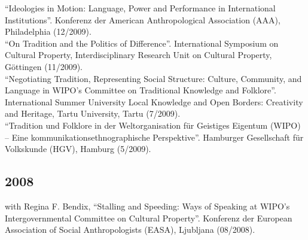 \enquote{Ideologies in Motion: Language, Power and Performance in International Institutions}. Konferenz der American Anthropological Association (AAA), Philadelphia (12/2009).\\[.25cm]\enquote{On Tradition and the Politics of Difference}. International Symposium on Cultural Property, Interdisciplinary Research Unit on Cultural Property, Göttingen (11/2009).\\[.25cm]\enquote{Negotiating Tradition, Representing Social Structure: Culture, Community, and Language in WIPO’s Committee on Traditional Knowledge and Folklore}. International Summer University Local Knowledge and Open Borders: Creativity and Heritage, Tartu University, Tartu (7/2009).\\[.25cm]\enquote{Tradition und Folklore in der Weltorganisation für Geistiges Eigentum (WIPO) – Eine kommunikationsethnographische Perspektive}. Hamburger Gesellschaft für Volkskunde (HGV), Hamburg (5/2009).\subsection*{2008}
with Regina F. Bendix, \enquote{Stalling and Speeding: Ways of Speaking at WIPO’s Intergovernmental Committee on Cultural Property}. Konferenz der European Association of Social Anthropologists (EASA), Ljubljana (08/2008).  
  
